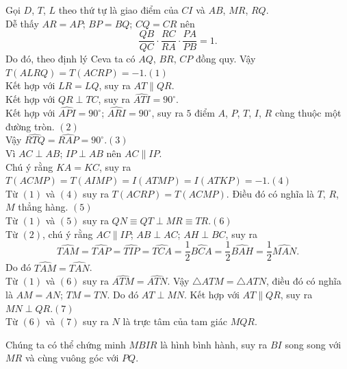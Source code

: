 \begin{bt}
{\noindent Gọi $D$, $T$, $L$ theo thứ tự là giao điểm của $CI$ và $AB$, $MR$, $RQ$.\\
Dễ thấy $AR=AP$; $BP=BQ$; $CQ=CR$ nên
$$\dfrac{QB}{QC}\cdot\dfrac{RC}{RA}\cdot\dfrac{PA}{PB}=1.$$
Do đó, theo định lý Ceva ta có $AQ$, $BR$, $CP$ đồng quy. Vậy $T(ALRQ)=T(ACRP)=-1$.\hfill $(1)$\\
Kết hợp với $LR=LQ$, suy ra $AT\parallel QR$.\\
Kết hợp với $QR\perp TC$, suy ra $\widehat{ATI}=90^\circ$.\\
Kết hợp với $\widehat{API}=90^\circ$; $\widehat{ARI}=90^\circ$, suy ra $5$ điểm $A$, $P$, $T$, $I$, $R$ cùng thuộc một đường tròn. \hfill $(2)$\\
Vậy $\widehat{RTQ}=\widehat{RAP}=90^\circ$.\hfill $(3)$\\
Vì $AC\perp AB$; $IP\perp AB$ nên $AC\parallel IP$. \\
Chú ý rằng $KA=KC$, suy ra $T(ACMP)=T(AIMP)=I(ATMP)=I(ATKP)=-1$.\hfill $(4)$\\
Từ $(1)$ và $(4)$ suy ra $T(ACRP)=T(ACMP)$. Điều đó có nghĩa là $T$, $R$, $M$ thẳng hàng. \hfill $(5)$\\
Từ $(1)$ và $(5)$ suy ra $QN\equiv QT\perp MR\equiv TR$.\hfill $(6)$\\
Từ $(2)$, chú ý rằng $AC\parallel IP$; $AB\perp AC$; $AH\perp BC$, suy ra
$$\widehat{TAM}=\widehat{TAP}=\widehat{TIP}=\widehat{TCA}=\dfrac{1}{2}\widehat{BCA}=\dfrac{1}{2}\widehat{BAH}=\dfrac{1}{2}\widehat{MAN}.$$
Do đó $\widehat{TAM}=\widehat{TAN}$.\\
Từ $(1)$ và $(6)$ suy ra $\widehat{ATM}=\widehat{ATN}$. Vậy $\triangle ATM=\triangle ATN$, điều đó có nghĩa là $AM=AN$; $TM=TN$. Do đó $AT\perp MN$.
Kết hợp với $AT\parallel QR$, suy ra $MN\perp QR$.\hfill $(7)$\\
Từ $(6)$ và $(7)$ suy ra $N$ là trực tâm của tam giác $MQR$.

\begin{nx}
Chúng ta có thể chứng minh $MBIR$ là hình bình hành, suy ra $BI$ song song với $MR$ và cùng vuông góc với $PQ$.
\end{nx}
}
\end{bt}
